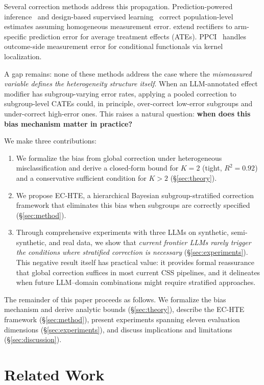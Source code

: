 \documentclass[11pt,a4paper]{article}
\begin{document}
Several correction methods address this propagation. Prediction-powered inference~\citep[PPI;][]{angelopoulos2023prediction} and design-based supervised learning~\citep[DSL;][]{egami2024using} correct population-level estimates assuming homogeneous measurement error. \citet{mozer2026arm} extend rectifiers to arm-specific prediction error for average treatment effects (ATEs). PPCI~\citep{sui2026ppci} handles outcome-side measurement error for conditional functionals via kernel localization.

A gap remains: none of these methods address the case where the \emph{mismeasured variable defines the heterogeneity structure itself}. When an LLM-annotated effect modifier has subgroup-varying error rates, applying a pooled correction to subgroup-level CATEs could, in principle, over-correct low-error subgroups and under-correct high-error ones. This raises a natural question: \textbf{when does this bias mechanism matter in practice?}

We make three contributions:
\begin{enumerate}
\item We formalize the bias from global correction under heterogeneous misclassification and derive a closed-form bound for $K{=}2$ (tight, $R^2{=}0.92$) and a conservative sufficient condition for $K{>}2$ (\S\ref{sec:theory}).
\item We propose EC-HTE, a hierarchical Bayesian subgroup-stratified correction framework that eliminates this bias when subgroups are correctly specified (\S\ref{sec:method}).
\item Through comprehensive experiments with three LLMs on synthetic, semi-synthetic, and real data, we show that \emph{current frontier LLMs rarely trigger the conditions where stratified correction is necessary} (\S\ref{sec:experiments}). This negative result itself has practical value: it provides formal reassurance that global correction suffices in most current CSS pipelines, and it delineates when future LLM--domain combinations might require stratified approaches.
\end{enumerate}

The remainder of this paper proceeds as follows. We formalize the bias mechanism and derive analytic bounds (\S\ref{sec:theory}), describe the EC-HTE framework (\S\ref{sec:method}), present experiments spanning eleven evaluation dimensions (\S\ref{sec:experiments}), and discuss implications and limitations (\S\ref{sec:discussion}).


\section{Related Work}
\end{document}
